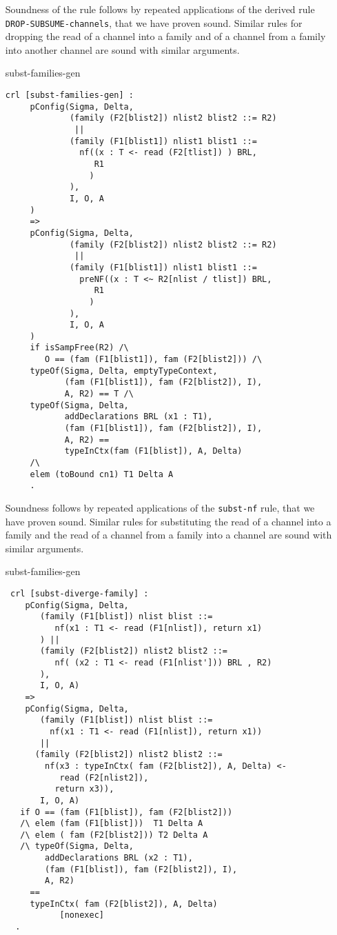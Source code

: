 \documentclass{article}
\begin{document}
\begin{itemize}
  Soundness of the rule follows by repeated applications of the
  derived rule \texttt{DROP-SUBSUME-channels}, that we have proven sound.
  Similar rules for dropping the read of a channel into a family and of 
  a channel from a family into another channel are sound with similar
  arguments.
  
  \item[subst-families-gen]

\begin{lstlisting}
crl [subst-families-gen] :
     pConfig(Sigma, Delta, 
             (family (F2[blist2]) nlist2 blist2 ::= R2)
              || 
             (family (F1[blist1]) nlist1 blist1 ::=
               nf((x : T <- read (F2[tlist]) ) BRL, 
                  R1
                 )
             ),
             I, O, A
     )
     => 
     pConfig(Sigma, Delta, 
             (family (F2[blist2]) nlist2 blist2 ::= R2)
              || 
             (family (F1[blist1]) nlist1 blist1 ::=
               preNF((x : T <~ R2[nlist / tlist]) BRL, 
                  R1
                 )
             ),
             I, O, A
     )
     if isSampFree(R2) /\
        O == (fam (F1[blist1]), fam (F2[blist2])) /\ 
     typeOf(Sigma, Delta, emptyTypeContext, 
            (fam (F1[blist1]), fam (F2[blist2]), I), 
            A, R2) == T /\
     typeOf(Sigma, Delta, 
            addDeclarations BRL (x1 : T1), 
            (fam (F1[blist1]), fam (F2[blist2]), I), 
            A, R2) == 
            typeInCtx(fam (F1[blist]), A, Delta)
     /\
     elem (toBound cn1) T1 Delta A 
     . 
\end{lstlisting}

Soundness follows by repeated applications of the
\texttt{subst-nf} rule, that we have proven sound.
Similar rules for substituting the read of a channel into a family
and the read of a channel from a family into a channel are sound
with similar arguments.

\item[subst-families-gen]

\begin{lstlisting}
 crl [subst-diverge-family] : 
    pConfig(Sigma, Delta, 
       (family (F1[blist]) nlist blist ::= 
          nf(x1 : T1 <- read (F1[nlist]), return x1)
       ) || 
       (family (F2[blist2]) nlist2 blist2 ::= 
          nf( (x2 : T1 <- read (F1[nlist'])) BRL , R2)
       ),
       I, O, A)    
    =>
    pConfig(Sigma, Delta, 
       (family (F1[blist]) nlist blist ::= 
         nf(x1 : T1 <- read (F1[nlist]), return x1))
       || 
      (family (F2[blist2]) nlist2 blist2 ::= 
        nf(x3 : typeInCtx( fam (F2[blist2]), A, Delta) <- 
           read (F2[nlist2]), 
          return x3)),
       I, O, A) 
   if O == (fam (F1[blist]), fam (F2[blist2]))
   /\ elem (fam (F1[blist]))  T1 Delta A
   /\ elem ( fam (F2[blist2])) T2 Delta A
   /\ typeOf(Sigma, Delta, 
        addDeclarations BRL (x2 : T1), 
        (fam (F1[blist]), fam (F2[blist2]), I), 
        A, R2) 
     == 
     typeInCtx( fam (F2[blist2]), A, Delta)    
           [nonexec]
  . 
\end{lstlisting}


\end{itemize}
\end{document}

